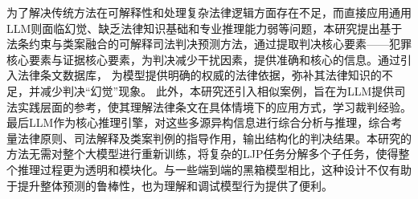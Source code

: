 为了解决传统方法在可解释性和处理复杂法律逻辑方面存在不足，而直接应用通用LLM则面临幻觉、缺乏法律知识基础和专业推理能力弱等问题，本研究提出基于法条约束与类案融合的可解释司法判决预测方法，通过提取判决核心要素——犯罪核心要素与证据核心要素，为判决减少干扰因素，提供准确和核心的信息。通过引入法律条文数据库， 为模型提供明确的权威的法律依据，弥补其法律知识的不足，并减少判决“幻觉”现象。 此外，本研究还引入相似案例，旨在为LLM提供司法实践层面的参考，使其理解法律条文在具体情境下的应用方式，学习裁判经验。最后LLM作为核心推理引擎，对这些多源异构信息进行综合分析与推理，综合考量法律原则、司法解释及类案判例的指导作用，输出结构化的判决结果。本研究的方法无需对整个大模型进行重新训练，将复杂的LJP任务分解多个子任务，使得整个推理过程更为透明和模块化。与一些端到端的黑箱模型相比，这种设计不仅有助于提升整体预测的鲁棒性，也为理解和调试模型行为提供了便利。

